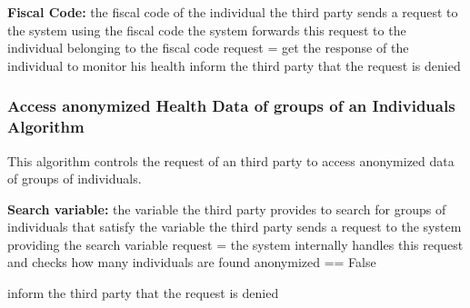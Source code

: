 \documentclass[12pt]{article}
\begin{document}
\begin{algorithm}[H]
 \textbf{Fiscal Code:} the fiscal code of the individual\;
 \vspace{1mm}
 the third party sends a request to the system using the fiscal code\;\vspace{1mm}
 the system forwards this request to the individual belonging to the fiscal code\;\vspace{1mm}
 request = get the response of the individual to monitor his health\; \vspace{1mm}
    {    
    inform the third party that the request is denied\;   
    }  

    
 \vspace{5mm}
 \caption{Access Health Data of an Individual.}
\end{algorithm}


\newpage
\subsubsection{Access anonymized Health Data of groups of an Individuals Algorithm}

This algorithm controls the request of an third party to access anonymized data of groups of individuals.
\vspace{10mm}

\begin{algorithm}[H]
 \textbf{Search variable:} the variable the third party provides to search for groups of individuals that satisfy the variable\;
 \vspace{1mm}
 the third party sends a request to the system providing the search variable\;\vspace{1mm}
 request = the system internally handles this request and checks how many individuals are found\;\vspace{1mm}
    {    
    anonymized == False\;   
    }  
 
    {    
    inform the third party that the request is denied\;   
    }  
 \vspace{5mm}
 \caption{Access anonymized Health Data of groups of an Individuals.}
\end{algorithm}
\end{document}
